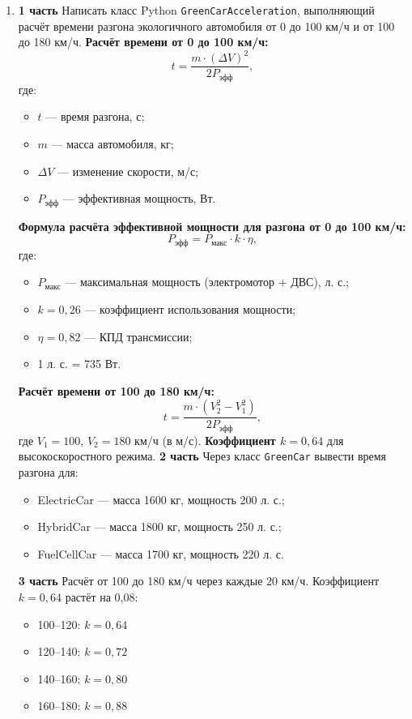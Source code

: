 \begin{enumerate}
    \item[2] \textbf{1 часть}  
    Написать класс Python \texttt{GreenCarAcceleration}, выполняющий расчёт времени разгона экологичного автомобиля от 0 до 100 км/ч и от 100 до 180 км/ч.  
    \textbf{Расчёт времени от 0 до 100 км/ч:}
    \begin{equation}
    t = \frac{m \cdot (\Delta V)^2}{2P_{\text{эфф}}},
    \end{equation}
    где:  
    \begin{itemize}
        \item $t$ — время разгона, с;  
        \item $m$ — масса автомобиля, кг;  
        \item $\Delta V$ — изменение скорости, м/с;  
        \item $P_{\text{эфф}}$ — эффективная мощность, Вт.  
    \end{itemize}
    \textbf{Формула расчёта эффективной мощности для разгона от 0 до 100 км/ч:}
    \begin{equation}
    P_{\text{эфф}} = P_{\text{макс}} \cdot k \cdot \eta,
    \end{equation}
    где:  
    \begin{itemize}
        \item $P_{\text{макс}}$ — максимальная мощность (электромотор + ДВС), л. с.;  
        \item $k = 0{,}26$ — коэффициент использования мощности;  
        \item $\eta = 0{,}82$ — КПД трансмиссии;  
        \item 1 л. с. = 735 Вт.  
    \end{itemize}
    \textbf{Расчёт времени от 100 до 180 км/ч:}
    \begin{equation}
    t = \frac{m \cdot (V_2^2 - V_1^2)}{2P_{\text{эфф}}},
    \end{equation}
    где $V_1 = 100$, $V_2 = 180$ км/ч (в м/с).  
    \textbf{Коэффициент $k = 0{,}64$} для высокоскоростного режима.  
    \textbf{2 часть}  
    Через класс \texttt{GreenCar} вывести время разгона для:  
    \begin{itemize}
        \item ElectricCar — масса 1600 кг, мощность 200 л. с.;  
        \item HybridCar — масса 1800 кг, мощность 250 л. с.;  
        \item FuelCellCar — масса 1700 кг, мощность 220 л. с.  
    \end{itemize}
    \textbf{3 часть}  
    Расчёт от 100 до 180 км/ч через каждые 20 км/ч. Коэффициент $k = 0{,}64$ растёт на 0{,}08:  
    \begin{itemize}
        \item 100–120: $k = 0{,}64$  
        \item 120–140: $k = 0{,}72$  
        \item 140–160: $k = 0{,}80$  
        \item 160–180: $k = 0{,}88$  
    \end{itemize}


\end{enumerate}
